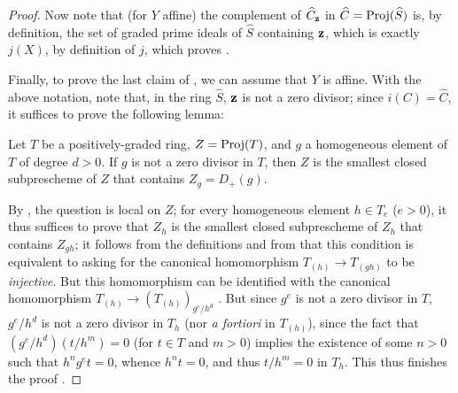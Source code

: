 \begin{proof}
Now note that (for $Y$ affine) the complement of $\widehat{C}_{\mathbf{z}}$ in $\widehat{C}=\operatorname{Proj}(\widehat{S})$
is, by definition, the set of graded prime ideals of $\widehat{S}$ containing $\mathbf{z}$, which is exactly $j(X)$, by definition of $j$, which proves .

Finally, to prove the last claim of , we can assume that $Y$ is affine.
With the above notation, note that, in the ring $\widehat{S}$, $\mathbf{z}$ is not a zero divisor;
since $i(C)=\widehat{C}$, it suffices to prove the following lemma:
\begin{lemma}[8.3.2.7]
\label{II.8.3.2.7}
Let $T$ be a positively-graded ring, $Z=\operatorname{Proj}(T)$, and $g$ a homogeneous element of $T$ of degree $d>0$.
If $g$ is not a zero divisor in $T$, then $Z$ is the smallest closed subprescheme of $Z$ that contains $Z_g=D_+(g)$.
\end{lemma}

By , the question is local on $Z$;
for every homogeneous element $h\in T_e$ ($e>0$), it thus suffices to prove that $Z_h$ is the smallest closed subprescheme of $Z_h$ that contains $Z_{gh}$;
it follows from the definitions and from  that this condition is equivalent to asking for the canonical homomorphism $T_{(h)}\to T_{(gh)}$ to be \emph{injective}.
But this homomorphism can be identified with the canonical homomorphism $T_{(h)}\to(T_{(h)})_{g^e/h^d}$ .
But since $g^e$ is not a zero divisor in $T$, $g^e/h^d$ is not a zero divisor in $T_h$ (nor \emph{a fortiori} in $T_{(h)}$), since the fact that $(g^e/h^d)(t/h^m)=0$ (for $t\in T$ and $m>0$) implies the existence of some $n>0$ such that $h^ng^et=0$, whence $h^nt=0$, and thus $t/h^m=0$ in $T_h$.
This thus finishes the proof .
\end{proof}

